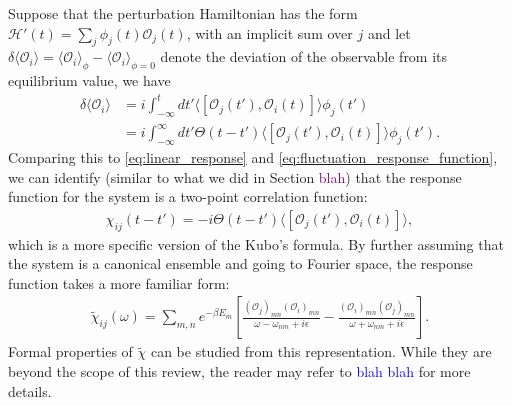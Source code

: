 \documentclass[reprint,
nofootinbib,
amsmath,amssymb,
aps]{revtex4-1}
\newcommand{\be}{\beta}
\newcommand{\f}[2]{\frac{#1}{#2}}
\newcommand{\lb}{\left[}
\newcommand{\rb}{\right]}
\begin{document}
Suppose that the perturbation Hamiltonian has the form $\mathcal{H}'(t) = \sum_j \phi_j (t) \mathcal{O}_j(t)$, with an implicit sum over $j$ and let $\delta \langle \mathcal{O}_i \rangle = \langle \mathcal{O}_i \rangle_\phi - \langle  \mathcal{O}_i \rangle_{\phi = 0}$ denote the deviation of the observable from its equilibrium value, we have
\begin{align*}
\delta \langle \mathcal{O}_i \rangle 
&=  i \int_{-\infty}^t dt' \langle  [ \mathcal{O}_j(t'), \mathcal{O}_i(t)   ] \rangle \phi_j(t') \\
&= i \int_{-\infty}^\infty dt' \Theta(t-t') \langle  [ \mathcal{O}_j(t'), \mathcal{O}_i(t)   ] \rangle \phi_j(t').
\end{align*} 
Comparing this to \eqref{eq:linear_response} and \eqref{eq:fluctuation_response_function}, we can identify (similar to what we did in Section \textcolor{purple}{blah}) that the response function for the system is a two-point correlation function:
\begin{align}\label{eq:corr_func}
\chi_{ij}(t-t') = -i \Theta(t-t') \langle  [ \mathcal{O}_j(t'), \mathcal{O}_i(t)   ] \rangle,
\end{align}
which is a more specific version of the Kubo's formula. By further assuming that the system is a canonical ensemble and going to Fourier space, the response function takes a more familiar form:
\begin{align*}
\widetilde{\chi}_{ij}(\omega) = \sum_{m,n} e^{-\be E_m} \lb 
\f{(\mathcal{O}_j)_{mn}(\mathcal{O}_i)_{mn}}{\omega - \omega_{nm} + i\epsilon} 
- 
\f{(\mathcal{O}_i)_{mn}(\mathcal{O}_j)_{mn}}{\omega + \omega_{nm} + i\epsilon} 
\rb.
\end{align*}
Formal properties of $\widetilde{\chi}$ can be studied from this representation. While they are beyond the scope of this review, the reader may refer to \textcolor{blue}{blah blah} for more details.  
\end{document}
